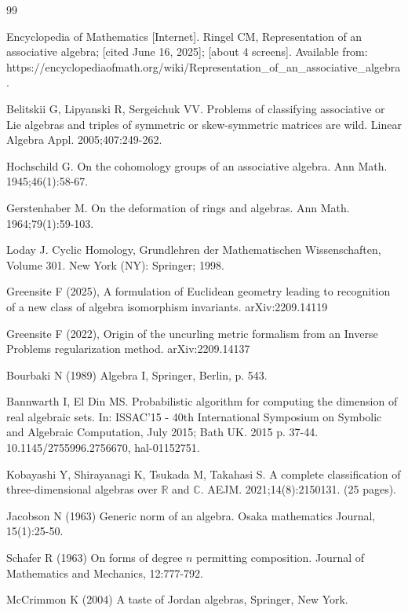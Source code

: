 \documentclass{amsart}
\theoremstyle{definition}
\numberwithin{theorem}{section}
\numberwithin{equation}{section}
\begin{document}
\bigskip



   \begin{thebibliography}{99}
   
 Encyclopedia of Mathematics [Internet].  Ringel CM, Representation of an associative algebra; [cited June 16, 2025]; [about 4 screens]. Available from: \\ https://encyclopediaofmath.org/wiki/Representation\_of\_an\_associative\_algebra.
          
        Belitskii G, Lipyanski R, Sergeichuk VV.  Problems of classifying associative or Lie algebras and triples of symmetric or skew-symmetric matrices are wild.  Linear Algebra Appl.  2005;407:249-262.
       
            Hochschild G.  On the cohomology groups of an associative algebra.   Ann Math.  1945;46(1):58-67.
       
             Gerstenhaber M.  On the deformation of rings and algebras.  Ann Math.  1964;79(1):59-103.
             
             Loday J. Cyclic Homology, Grundlehren der Mathematischen Wissenschaften, Volume 301.  New York (NY): Springer; 1998.                      

 Greensite F (2025), A formulation of Euclidean geometry leading to recognition of a new class of algebra isomorphism invariants. arXiv:2209.14119

 Greensite F (2022), Origin of the uncurling metric formalism from an Inverse Problems regularization method. arXiv:2209.14137

 Bourbaki N (1989) Algebra I, Springer, Berlin, p. 543.   

 Bannwarth I, El Din MS.  Probabilistic algorithm for computing the dimension of real algebraic sets. In: ISSAC'15 - 40th International Symposium on Symbolic and Algebraic Computation, July 2015; Bath UK. 2015 p. 37-44.  10.1145/2755996.2756670, hal-01152751.     
                 
 Kobayashi Y, Shirayanagi K, Tsukada M, Takahasi S.  A complete classification of three-dimensional algebras over $\mathbb{R}$ and $\mathbb{C}$.  AEJM.   2021;14(8):2150131. (25 pages).

               Jacobson N  (1963) Generic norm of an algebra. Osaka mathematics Journal, 15(1):25-50.
  
          Schafer R (1963) On forms of degree $n$ permitting composition. Journal of Mathematics and Mechanics, 12:777-792.       
      
        McCrimmon K (2004) A taste of Jordan algebras, Springer, New York.
       

      \end{thebibliography}
      
  \bigskip \bigskip        
      

 
 
\end{document}
